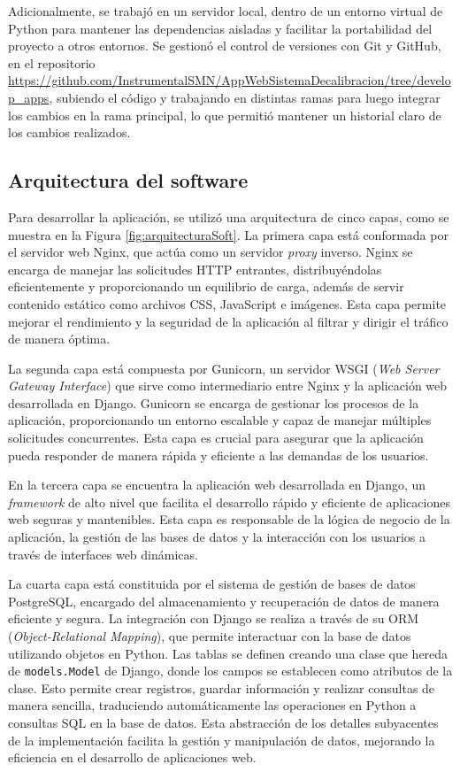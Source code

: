 Adicionalmente, se trabajó en un servidor local, dentro de un entorno virtual de Python para mantener las dependencias aisladas y facilitar la portabilidad del proyecto a otros entornos. Se gestionó el control de versiones con Git y GitHub, en el repositorio \url{https://github.com/InstrumentalSMN/AppWebSistemaDecalibracion/tree/develop_apps}, subiendo el código y trabajando en distintas ramas para luego integrar los cambios en la rama principal, lo que permitió mantener un historial claro de los cambios realizados.
\subsection{Arquitectura del software}
Para desarrollar la aplicación, se utilizó una arquitectura de cinco capas, como se muestra en la Figura \ref{fig:arquitecturaSoft}. La primera capa está conformada por el servidor web Nginx, que actúa como un servidor \textit{proxy} inverso. Nginx se encarga de manejar las solicitudes HTTP entrantes, distribuyéndolas eficientemente y proporcionando un equilibrio de carga, además de servir contenido estático como archivos CSS, JavaScript e imágenes. Esta capa permite mejorar el rendimiento y la seguridad de la aplicación al filtrar y dirigir el tráfico de manera óptima.

La segunda capa está compuesta por Gunicorn, un servidor WSGI (\textit{Web Server Gateway Interface}) que sirve como intermediario entre Nginx y la aplicación web desarrollada en Django. Gunicorn se encarga de gestionar los procesos de la aplicación, proporcionando un entorno escalable y capaz de manejar múltiples solicitudes concurrentes. Esta capa es crucial para asegurar que la aplicación pueda responder de manera rápida y eficiente a las demandas de los usuarios.

En la tercera capa se encuentra la aplicación web desarrollada en Django, un \textit{framework} de alto nivel que facilita el desarrollo rápido y eficiente de aplicaciones web seguras y mantenibles.  Esta capa es responsable de la lógica de negocio de la aplicación, la gestión de las bases de datos y la interacción con los usuarios a través de interfaces web dinámicas.


La cuarta capa está constituida por el sistema de gestión de bases de datos PostgreSQL, encargado del almacenamiento y recuperación de datos de manera eficiente y segura. La integración con Django se realiza a través de su ORM (\textit{Object-Relational Mapping}), que permite interactuar con la base de datos utilizando objetos en Python. Las tablas se definen creando una clase que hereda de \texttt{models.Model} de Django, donde los campos se establecen como atributos de la clase. Esto permite crear registros, guardar información y realizar consultas de manera sencilla, traduciendo automáticamente las operaciones en Python a consultas SQL en la base de datos. Esta abstracción de los detalles subyacentes de la implementación facilita la gestión y manipulación de datos, mejorando la eficiencia en el desarrollo de aplicaciones web.




